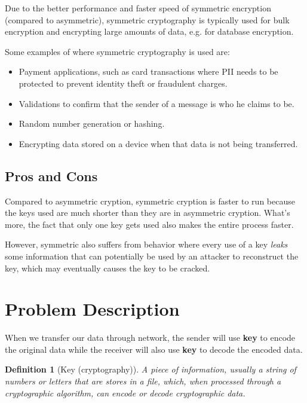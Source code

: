 \documentclass[11pt]{article}
\newtheorem{definition}[theorem]{Definition}
\begin{document}
Due to the better performance and faster speed of symmetric encryption (compared to asymmetric), symmetric cryptography is typically used for bulk encryption and encrypting large amounts of data, e.g. for database encryption.

Some examples\citep{Symmetric_Encryption} of where symmetric cryptography is used are:

\begin{itemize}
    \item Payment applications, such as card transactions where PII needs to be protected to prevent identity theft or fraudulent charges.
    \item Validations to confirm that the sender of a message is who he claims to be.
    \item Random number generation or hashing.
    \item Encrypting data stored on a device when that data is not being transferred.
\end{itemize}

\subsection{Pros and Cons}

Compared to asymmetric cryption, symmetric cryption is faster to run because the keys used are much shorter than they are in asymmetric cryption. What's more, the fact that only one key gets used also makes the entire process faster.

However, symmetric also suffers from behavior where every use of a key \textit{leaks} some information that can potentially be used by an attacker to reconstruct the key, which may eventually causes the key to be cracked.

\section{Problem Description}
When we transfer our data through network, the sender will use \textbf{key} to encode the original data while the receiver will also use \textbf{key} to decode the encoded data.

\begin{definition}
[Key (cryptography)]
A piece of information, usually a string of numbers or letters that are stores in a file, which, when processed through a cryptographic algorithm, can encode or decode cryptographic data.
\end{definition}
\end{document}
